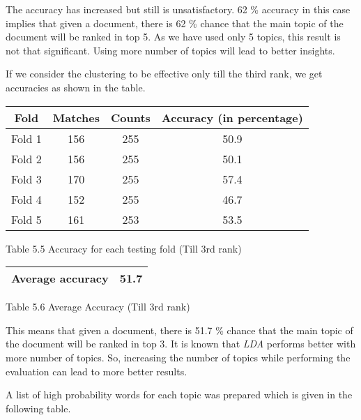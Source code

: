 \par
The accuracy has increased but still is unsatisfactory. 62 \% accuracy in this case implies that given a document, there is 62 \%
chance that the main topic of the document will be ranked in top 5. As we have used only 5 topics, this result is not that significant. Using
more number of topics will lead to better insights. 

\par 
If we consider the clustering to be effective only till the third rank, we get accuracies as shown in the table.

\begin{center}
\begin{tabular}{ |c|c|c|c| }
  \hline
  Fold & Matches & Counts & Accuracy (in percentage) \\ \hline
  Fold 1 & 156 & 255 & 50.9 \\ \hline
  Fold 2 & 156 & 255 & 50.1 \\ \hline
  Fold 3 & 170 & 255 & 57.4 \\ \hline
  Fold 4 & 152 & 255 & 46.7 \\ \hline
  Fold 5 & 161 & 253 & 53.5 \\ \hline
\end{tabular}
\end{center}
\begin{center}
 Table 5.5 Accuracy for each testing fold (Till 3rd rank)
\end{center}

\begin{center}
\begin{tabular}{ |c|c| }
  \hline
  Average accuracy & 51.7 \\ \hline
\end{tabular}
\end{center}
\begin{center}
 Table 5.6 Average Accuracy (Till 3rd rank)
\end{center}

\par 

This means that given a document, there is 51.7 \% chance that the main topic of the document will be ranked in top 3. It is known
that \textit{LDA} performs better with more number of topics. So, increasing the number of topics while performing the evaluation can 
lead to more better results. 

A list of high probability words for each topic was prepared which is given in the following table. 

